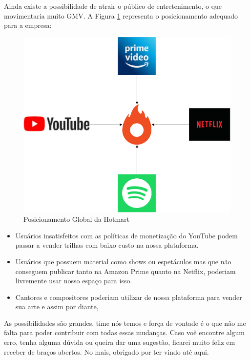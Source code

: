 Ainda existe a possibilidade de atrair o público de entretenimento, o que movimentaria muito GMV. A Figura \ref{pic_13} representa o posicionamento adequado para a empresa:
\begin{figure}[H]
    \centering
    \includegraphics[scale=0.50,keepaspectratio=true]{images/13.png}
    \caption{Posicionamento Global da Hotmart}
    \label{pic_13}
\end{figure}

\begin{itemize}
    \item Usuários insatisfeitos com as políticas de monetização do YouTube podem passar a vender trilhas com baixo custo na nossa plataforma.
    \item Usuários que possuem material como shows ou espetáculos  mas que não conseguem publicar tanto na Amazon Prime quanto na Netflix, poderiam livremente usar nosso espaço para isso.
    \item Cantores e compositores poderiam utilizar de nossa plataforma para vender sua arte e assim por diante,
\end{itemize}

As possibilidades são grandes, time nós temos e força de vontade é o que não me falta para poder contribuir com todas essas mudanças. Caso voê encontre algum erro, tenha alguma dúvida ou queira dar uma sugestão, ficarei muito feliz em receber de braços abertos. No mais, obrigado por ter vindo até aqui.
